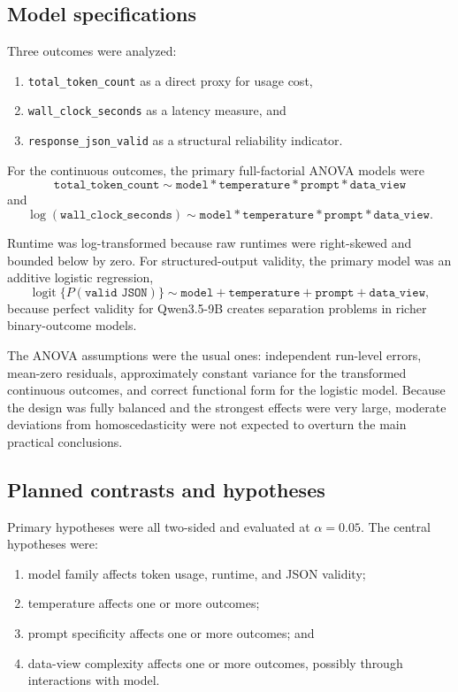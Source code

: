 \documentclass{article}
\begin{document}
\subsection{Model specifications}

Three outcomes were analyzed:
\begin{enumerate}[leftmargin=1.7em]
    \item \texttt{total\_token\_count} as a direct proxy for usage cost,
    \item \texttt{wall\_clock\_seconds} as a latency measure, and
    \item \texttt{response\_json\_valid} as a structural reliability indicator.
\end{enumerate}

For the continuous outcomes, the primary full-factorial ANOVA models were
\[
\texttt{total\_token\_count} \sim \texttt{model} * \texttt{temperature} * \texttt{prompt} * \texttt{data\_view}
\]
and
\[
\log(\texttt{wall\_clock\_seconds}) \sim \texttt{model} * \texttt{temperature} * \texttt{prompt} * \texttt{data\_view}.
\]

Runtime was log-transformed because raw runtimes were right-skewed and bounded below by zero. For structured-output validity, the primary model was an additive logistic regression,
\[
\operatorname{logit}\{P(\texttt{valid JSON})\} \sim \texttt{model} + \texttt{temperature} + \texttt{prompt} + \texttt{data\_view},
\]
because perfect validity for Qwen3.5-9B creates separation problems in richer binary-outcome models.

The ANOVA assumptions were the usual ones: independent run-level errors, mean-zero residuals, approximately constant variance for the transformed continuous outcomes, and correct functional form for the logistic model. Because the design was fully balanced and the strongest effects were very large, moderate deviations from homoscedasticity were not expected to overturn the main practical conclusions.

\subsection{Planned contrasts and hypotheses}

Primary hypotheses were all two-sided and evaluated at $\alpha = 0.05$. The central hypotheses were:
\begin{enumerate}[leftmargin=1.7em]
    \item model family affects token usage, runtime, and JSON validity;
    \item temperature affects one or more outcomes;
    \item prompt specificity affects one or more outcomes; and
    \item data-view complexity affects one or more outcomes, possibly through interactions with model.
\end{enumerate}
\end{document}
